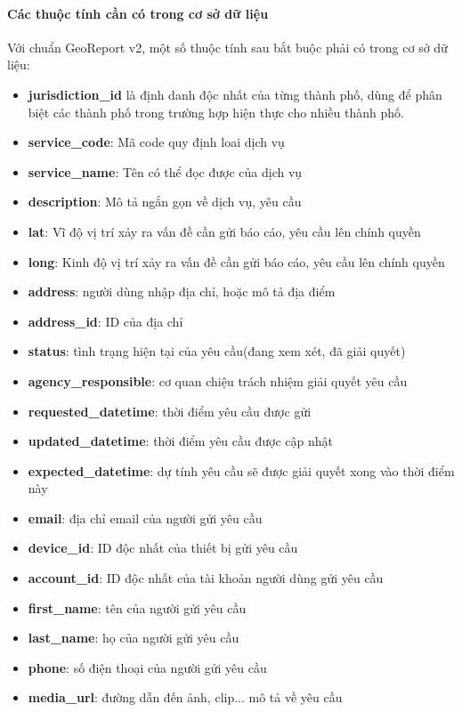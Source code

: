 \documentclass[a4paper]{article}
\begin{document}
\paragraph*{Các thuộc tính cần có trong cơ sở dữ liệu}
Với chuẩn GeoReport v2, một số thuộc tính sau bắt buộc phải có trong cơ sở dữ liệu:
\begin{itemize}
	\item \textbf{jurisdiction\_id} là định danh độc nhất của từng thành phố, dùng để phân biệt các thành phố trong trường hợp hiện thực cho nhiều thành phố.
	\item \textbf{service\_code}: Mã code quy định loai dịch vụ
	\item \textbf{service\_name}: Tên có thể đọc được của dịch vụ
	\item \textbf{description}: Mô tả ngắn gọn về dịch vụ, yêu cầu
	\item \textbf{lat}: Vĩ độ vị trí xảy ra vấn đề cần gửi báo cáo, yêu cầu lên chính quyền
	\item \textbf{long}: Kinh độ vị trí xảy ra vấn đề cần gửi báo cáo, yêu cầu lên chính quyền
	\item \textbf{address}: người dùng nhập địa chỉ, hoặc mô tả địa điểm
	\item \textbf{address\_id}: ID của địa chỉ
	\item \textbf{status}: tình trạng hiện tại của yêu cầu(đang xem xét, đã giải quyết)
	\item \textbf{agency\_responsible}: cơ quan chiệu trách nhiệm giải quyết yêu cầu
	\item \textbf{requested\_datetime}: thời điểm yêu cầu được gửi
	\item \textbf{updated\_datetime}: thời điểm yêu cầu được cập nhật
	\item \textbf{expected\_datetime}: dự tính yêu cầu sẽ được giải quyết xong vào thời điểm này
	\item \textbf{email}: địa chỉ email của người gửi yêu cầu
	\item \textbf{device\_id}: ID độc nhất của thiết bị gửi yêu cầu
	\item \textbf{account\_id}: ID độc nhất của tài khoản người dùng gửi yêu cầu
	\item \textbf{first\_name}: tên của người gửi yêu cầu
	\item \textbf{last\_name}: họ của người gửi yêu cầu
	\item \textbf{phone}: số điện thoại của người gửi yêu cầu
	\item \textbf{media\_url}: đường dẫn đến ảnh, clip... mô tả về yêu cầu
\end{itemize}
\end{document}
